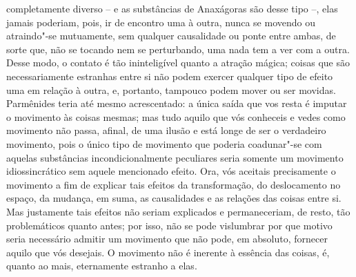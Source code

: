 completamente diverso -- e as substâncias de Anaxágoras são desse tipo
--, elas jamais poderiam, pois, ir de encontro uma à outra, nunca se
movendo ou atraindo"-se mutuamente, sem qualquer causalidade ou ponte
entre ambas, de sorte que, não se tocando nem se perturbando, uma nada
tem a ver com a outra. Desse modo, o contato é tão ininteligível quanto \label{ocontatoe}
a atração mágica; coisas que são necessariamente estranhas entre si não \label{coisasquesao}
podem exercer qualquer tipo de efeito uma em relação à outra, e,
portanto, tampouco podem mover ou ser movidas. Parmênides teria até
mesmo acrescentado: a única saída que vos resta é imputar o movimento
às coisas mesmas; mas tudo aquilo que vós conheceis e vedes como
movimento não passa, afinal, de uma ilusão e está longe de ser o
verdadeiro movimento, pois o único tipo de movimento que poderia
coadunar"-se com aquelas substâncias incondicionalmente peculiares seria
somente um movimento idiossincrático sem aquele mencionado efeito. Ora,
vós aceitais precisamente o movimento a fim de explicar tais efeitos da
transformação, do deslocamento no espaço, da mudança, em suma, as
causalidades e as relações das coisas entre si. Mas justamente tais
efeitos não seriam explicados e permaneceriam, de resto, tão
problemáticos quanto antes; por isso, não se pode vislumbrar por que
motivo seria necessário admitir um movimento que não pode, em absoluto,
fornecer aquilo que vós desejais. O movimento não é inerente à essência
das coisas, é, quanto ao mais, eternamente estranho a elas.

